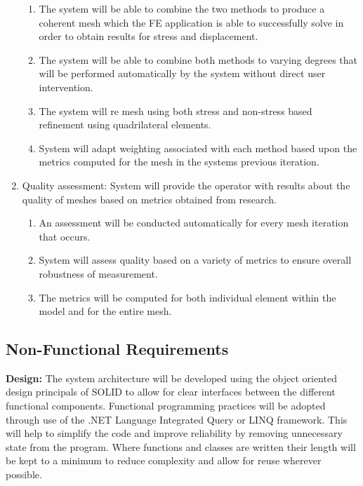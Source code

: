\begin{enumerate}
\begin{enumerate}
\item The system will be able to combine the two methods to produce a coherent mesh which the FE application is able to successfully solve in order to obtain results for stress and displacement.

\item The system will be able to combine both methods to varying degrees that will be performed automatically by the system without direct user intervention.
\item The system will re mesh using both stress and non-stress based refinement using quadrilateral elements.

\item System will adapt weighting associated with each method based upon the metrics computed for the mesh in the systems previous iteration.
\end{enumerate}

\item Quality assessment: System will provide the operator with results about the quality of meshes based on metrics obtained from research.

\begin{enumerate}
\item An assessment will be conducted automatically for every mesh iteration that occurs.

\item System will assess quality based on a variety of metrics to ensure overall robustness of measurement. 

\item The metrics will be computed for both individual element within the model and for the entire mesh.
\end{enumerate}
\end{enumerate}

\newpage
\subsection{Non-Functional Requirements}

\textbf{Design:} The system architecture will be developed using the object oriented design principals of SOLID to allow for clear interfaces between the different functional components. Functional programming practices will be adopted through use of the .NET Language Integrated Query or LINQ framework. This will help to simplify the code and improve reliability by removing unnecessary state from the program. Where functions and classes are written their length will be kept to a minimum to reduce complexity and allow for reuse wherever possible. \\ 

